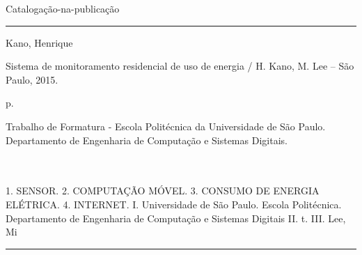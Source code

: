 \begin{fichacatalografica}
	\vspace*{\fill}					%
	\begin{center}
		Catalogação-na-publicação
	\end{center}
	\hrule							%
	\begin{center}					%
	\begin{minipage}[c]{12.5cm}		%
	
	Kano, Henrique 
	
	\hspace{0.5cm} Sistema de monitoramento residencial de uso de energia / H. Kano, M. Lee -- São Paulo, 2015.
	
	\hspace{0.5cm} \pageref{LastPage} p.\\
	
	\hspace{0.5cm}
	\parbox[t]{\textwidth}{Trabalho de Formatura - Escola Politécnica da Universidade de São
Paulo. Departamento de Engenharia de Computação e Sistemas Digitais.}\\
	\\
	
	\hspace{0.5cm}
		1. SENSOR.
		2. COMPUTAÇÃO MÓVEL.
		3. CONSUMO DE ENERGIA ELÉTRICA.
		4. INTERNET.
		I. Universidade de São Paulo. Escola Politécnica. Departamento de Engenharia de Computação e Sistemas Digitais
		II. t.
		III. Lee, Mi\\ 			
	
	\end{minipage}
	\end{center}
	\hrule
\end{fichacatalografica}

%    
